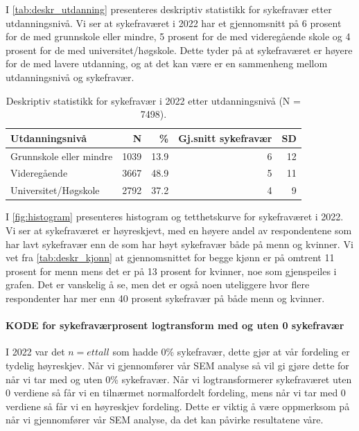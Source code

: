 \documentclass[
  12pt,
  a4paper,
  DIV=11,
  numbers=noendperiod]{scrartcl}
\let\oldparagraph\paragraph
\renewcommand{\paragraph}[1]{\oldparagraph{#1}\mbox{}}
\begin{document}
I \autoref{tab:deskr_utdanning} presenteres deskriptiv statistikk for
sykefravær etter utdanningsnivå. Vi ser at sykefraværet i 2022 har et
gjennomsnitt på 6 prosent for de med grunnskole eller mindre, 5 prosent
for de med videregående skole og 4 prosent for de med
universitet/høgskole. Dette tyder på at sykefraværet er høyere for de
med lavere utdanning, og at det kan være er en sammenheng mellom
utdanningsnivå og sykefravær.

\begin{table}[ht]
\centering
\begin{tabular}{lrrrr}
\toprule
Utdanningsnivå                & N    & \%   & Gj.snitt sykefravær & SD   \\
\midrule
Grunnskole eller mindre       & 1039 & 13.9 & 6                    & 12   \\
Videregående                   & 3667 & 48.9 & 5                    & 11   \\
Universitet/Høgskole           & 2792 & 37.2 & 4                    & 9    \\
\bottomrule
\end{tabular}
\caption{Deskriptiv statistikk for sykefravær i 2022 etter utdanningsnivå (N = 7498).}
\label{tab:deskr_utdanning}
\end{table}

I \autoref{fig:histogram} presenteres histogram og tetthetskurve for
sykefraværet i 2022. Vi ser at sykefraværet er høyreskjevt, med en
høyere andel av respondentene som har lavt sykefravær enn de som har
høyt sykefravær både på menn og kvinner. Vi vet fra
\autoref{tab:deskr_kjonn} at gjennomsnittet for begge kjønn er på
omtrent 11 prosent for menn mens det er på 13 prosent for kvinner, noe
som gjenspeiles i grafen. Det er vanskelig å se, men det er også noen
uteliggere hvor flere respondenter har mer enn 40 prosent sykefravær på
både menn og kvinner.

\paragraph{KODE for sykefraværprosent logtransform med og uten 0
sykefravær}\label{kode-for-sykefravuxe6rprosent-logtransform-med-og-uten-0-sykefravuxe6r}

I 2022 var det \(n=et tall\) som hadde 0\% sykefravær, dette gjør at vår
fordeling er tydelig høyreskjev. Når vi gjennomfører vår SEM analyse så
vil gi gjøre dette for når vi tar med og uten 0\% sykefravær. Når vi
logtransformerer sykefraværet uten 0 verdiene så får vi en tilnærmet
normalfordelt fordeling, mens når vi tar med 0 verdiene så får vi en
høyreskjev fordeling. Dette er viktig å være oppmerksom på når vi
gjennomfører vår SEM analyse, da det kan påvirke resultatene våre.
\end{document}
